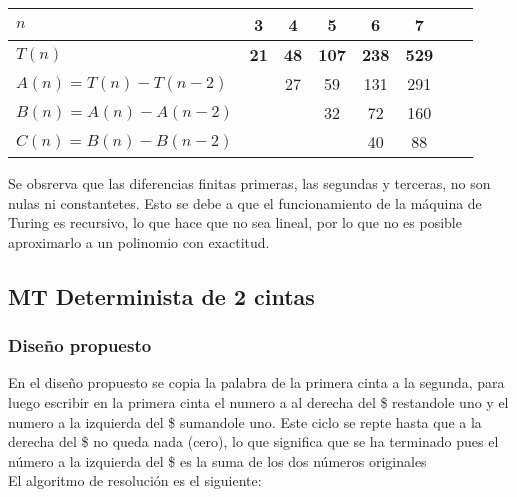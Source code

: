 \begin{table}[h]
    \centering
    \begin{tabular}{|l|c|c|c|c|c|c|c|}
        \hline
        $n$ & \textbf{3} & \textbf{4} & \textbf{5} & \textbf{6} & \textbf{7}\\ \hline
        $T(n)$ & \textbf{21} & \textbf{48} & \textbf{107} & \textbf{238} & \textbf{529}      \\ \hline
        \hline
        $A(n) = T(n) - T(n-2)$ &    & 27 & 59 & 131 & 291 \\ \hline
        $B(n) = A(n) - A(n-2)$ &    &   & 32 & 72 & 160 \\ \hline
        $C(n) = B(n) - B(n-2)$ &    &   &    & 40 & 88 \\ \hline
    \end{tabular}
\end{table}

Se obsrerva que las diferencias finitas primeras, las segundas y terceras, no son nulas ni constantetes. Esto se debe a que el funcionamiento de la máquina de Turing es recursivo, lo que hace que no sea lineal, por lo que no es posible aproximarlo a un polinomio con exactitud.\\




\subsection{MT Determinista de 2 cintas}

\subsubsection*{Diseño propuesto}

En el diseño propuesto se copia la palabra de la primera cinta a la segunda, para luego escribir en la primera cinta el numero a al derecha del \$ restandole uno y el numero a la izquierda del \$ sumandole uno. Este ciclo se repte hasta que a la derecha del \$ no queda nada (cero), lo que significa que se ha terminado pues el número a la izquierda del \$ es la suma de los dos números originales \\

El algoritmo de resolución es el siguiente:

